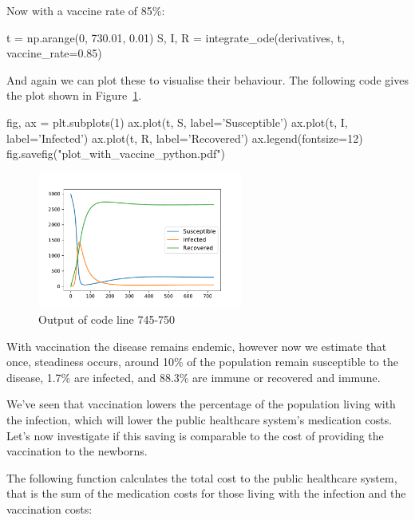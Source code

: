 Now with a vaccine rate of 85\%:

\begin{pyin}
t = np.arange(0, 730.01, 0.01)
S, I, R = integrate_ode(derivatives, t, vaccine_rate=0.85)
\end{pyin}

And again we can plot these to visualise their behaviour. The following code
gives the plot shown in Figure~\ref{fig:plot_with_vaccine}.

\begin{pyin-no-test}
fig, ax = plt.subplots(1)
ax.plot(t, S, label='Susceptible')
ax.plot(t, I, label='Infected')
ax.plot(t, R, label='Recovered')
ax.legend(fontsize=12)
fig.savefig("plot_with_vaccine_python.pdf")
\end{pyin-no-test}

\begin{figure}
\begin{center}
\includegraphics[width=0.6\textwidth]{./assets/plot_with_vaccine_python.pdf}
\end{center}
\caption{Output of code line 745-750}
\label{fig:plot_with_vaccine}
\end{figure}

With vaccination the disease remains endemic, however now we estimate that once,
steadiness occurs, around 10\% of the population remain susceptible to the
disease, 1.7\% are infected, and 88.3\% are immune or recovered and immune.

We've seen that vaccination lowers the percentage of the population living with
the infection, which will lower the public healthcare system's medication costs.
Let's now investigate if this saving is comparable to the cost of providing the
vaccination to the newborns.

The following function calculates the total cost to the public healthcare
system, that is the sum of the medication costs for those living with the
infection and the vaccination costs:

